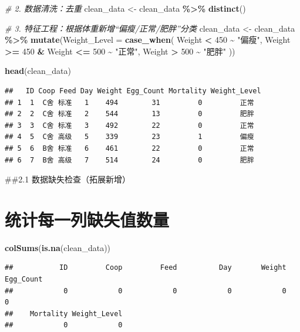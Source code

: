 \documentclass[
]{article}
\newenvironment{Shaded}{\begin{snugshade}}{\end{snugshade}}
\newcommand{\AttributeTok}[1]{\textcolor[rgb]{0.13,0.29,0.53}{#1}}
\newcommand{\CommentTok}[1]{\textcolor[rgb]{0.56,0.35,0.01}{\textit{#1}}}
\newcommand{\DecValTok}[1]{\textcolor[rgb]{0.00,0.00,0.81}{#1}}
\newcommand{\FunctionTok}[1]{\textcolor[rgb]{0.13,0.29,0.53}{\textbf{#1}}}
\newcommand{\NormalTok}[1]{#1}
\newcommand{\OtherTok}[1]{\textcolor[rgb]{0.56,0.35,0.01}{#1}}
\newcommand{\SpecialCharTok}[1]{\textcolor[rgb]{0.81,0.36,0.00}{\textbf{#1}}}
\newcommand{\StringTok}[1]{\textcolor[rgb]{0.31,0.60,0.02}{#1}}
\begin{document}
\begin{Shaded}
\begin{Highlighting}[]
\CommentTok{\# 2. 数据清洗：去重}
\NormalTok{clean\_data }\OtherTok{\textless{}{-}}\NormalTok{ clean\_data }\SpecialCharTok{\%\textgreater{}\%} \FunctionTok{distinct}\NormalTok{()}

\CommentTok{\# 3. 特征工程：根据体重新增“偏瘦/正常/肥胖”分类}
\NormalTok{clean\_data }\OtherTok{\textless{}{-}}\NormalTok{ clean\_data }\SpecialCharTok{\%\textgreater{}\%}
  \FunctionTok{mutate}\NormalTok{(}\AttributeTok{Weight\_Level =} \FunctionTok{case\_when}\NormalTok{(}
\NormalTok{    Weight }\SpecialCharTok{\textless{}} \DecValTok{450} \SpecialCharTok{\textasciitilde{}} \StringTok{"偏瘦"}\NormalTok{,}
\NormalTok{    Weight }\SpecialCharTok{\textgreater{}=} \DecValTok{450} \SpecialCharTok{\&}\NormalTok{ Weight }\SpecialCharTok{\textless{}=} \DecValTok{500} \SpecialCharTok{\textasciitilde{}} \StringTok{"正常"}\NormalTok{,}
\NormalTok{    Weight }\SpecialCharTok{\textgreater{}} \DecValTok{500} \SpecialCharTok{\textasciitilde{}} \StringTok{"肥胖"}
\NormalTok{  ))}

\FunctionTok{head}\NormalTok{(clean\_data)}
\end{Highlighting}
\end{Shaded}

\begin{verbatim}
##   ID Coop Feed Day Weight Egg_Count Mortality Weight_Level
## 1  1  C舍 标准   1    494        31         0         正常
## 2  2  C舍 标准   2    544        13         0         肥胖
## 3  3  C舍 标准   3    492        22         0         正常
## 4  5  C舍 高级   5    339        23         1         偏瘦
## 5  6  B舍 标准   6    461        22         0         正常
## 6  7  B舍 高级   7    514        24         0         肥胖
\end{verbatim}

\#\#2.1 数据缺失检查（拓展新增）

\section{统计每一列缺失值数量}\label{ux7edfux8ba1ux6bcfux4e00ux5217ux7f3aux5931ux503cux6570ux91cf}

\begin{Shaded}
\begin{Highlighting}[]
\FunctionTok{colSums}\NormalTok{(}\FunctionTok{is.na}\NormalTok{(clean\_data))}
\end{Highlighting}
\end{Shaded}

\begin{verbatim}
##           ID         Coop         Feed          Day       Weight    Egg_Count 
##            0            0            0            0            0            0 
##    Mortality Weight_Level 
##            0            0
\end{verbatim}
\end{document}
